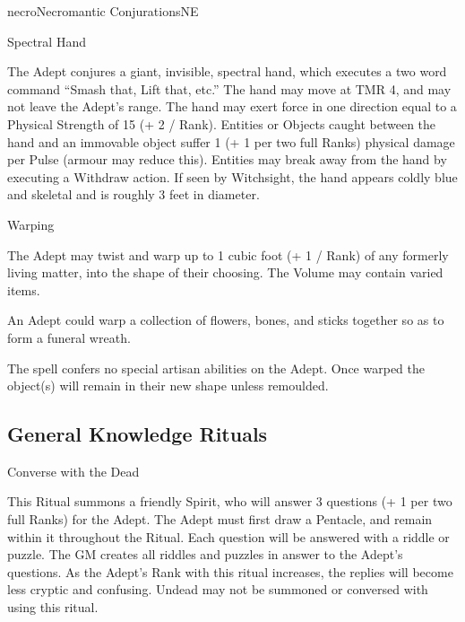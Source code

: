 \begin{college}[1.1]{necro}{Necromantic Conjurations}{NE}
\begin{spell}[G-10]{Spectral Hand}

\begin{effects}
The Adept conjures a giant, invisible, spectral hand, which executes
a two word command \eg  ``Smash that, Lift that, etc.''  The hand
may move at TMR 4, and may not leave the Adept's range.  The hand may
exert force in one direction equal to a Physical Strength of 15 (+ 2 /
Rank).  Entities or Objects caught between the hand and an immovable
object suffer 1 (+ 1 per two full Ranks) physical damage per Pulse
(armour may reduce this).  Entities may break away from the hand by
executing a Withdraw action.  If seen by Witchsight, the hand appears
coldly blue and skeletal and is roughly 3 feet in diameter.
\end{effects}
\end{spell}

\begin{spell}[G-11]{Warping}

\begin{effects}
The Adept may twist and warp up to 1 cubic foot (+ 1 / Rank) of any
formerly living matter, into the shape of their choosing.  The Volume
may contain varied items.

\begin{example}
An Adept could warp a collection of flowers, bones, and sticks
together so as to form a funeral wreath.
\end{example}

The spell confers no special artisan abilities on the Adept.  Once
warped the object(s) will remain in their new shape unless remoulded.
\end{effects}
\end{spell}

\subsection{General Knowledge Rituals}

\begin{ritual}[Q-1]{Converse with the Dead}

\begin{effects}
This Ritual summons a friendly Spirit, who will answer 3 questions (+
1 per two full Ranks) for the Adept.  The Adept must first draw a
Pentacle, and remain within it throughout the Ritual.  Each question
will be answered with a riddle or puzzle.  The GM creates all riddles
and puzzles in answer to the Adept's questions.  As the Adept's Rank
with this ritual increases, the replies will become less cryptic and
confusing.  Undead may not be summoned or conversed with using this
ritual.


\end{effects}
\end{ritual}
\end{college}
